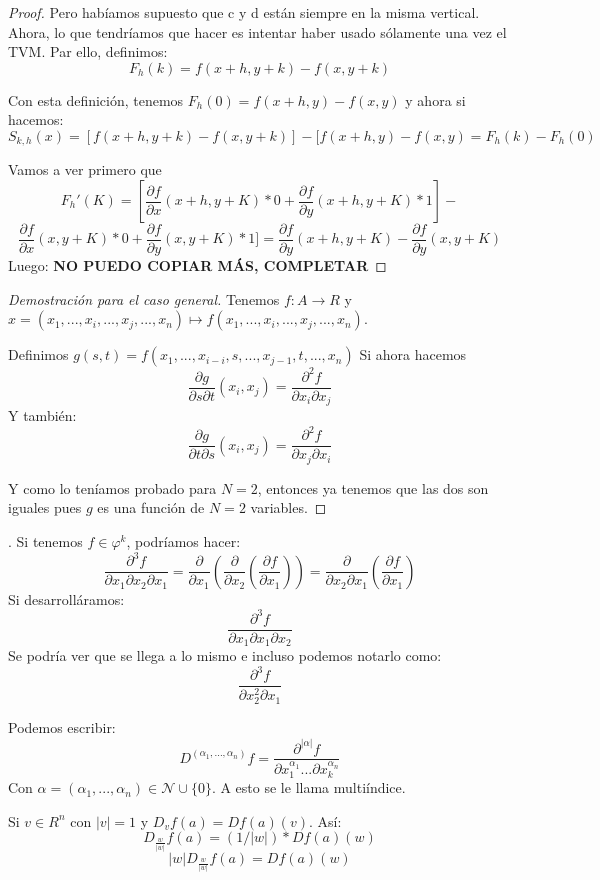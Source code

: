 \begin{proof}
Pero habíamos supuesto que c y d están siempre en la misma vertical. Ahora, lo que tendríamos que hacer es intentar haber usado sólamente una vez el TVM.
Par ello, definimos:
\[
F_h(k) = f(x+h,y+k)-f(x,y+k)
\]

Con esta definición, tenemos $F_h(0) = f(x+h,y)-f(x,y)$ y ahora si hacemos:
\[
S_{k,h}(x) =[f(x+h,y+k) - f(x,y+k)] - [f(x+h,y) -f(x,y) = F_h(k) - F_h(0)
\]

Vamos a ver primero que
\[
F_h'(K) = [\frac{\partial f}{\partial x}(x+h,y+K)*0 + \frac{\partial f}{\partial y}(x+h,y+K)*1] -
\]
\[
\frac{\partial f}{\partial x}(x,y+K)*0 + \frac{\partial f}{ \partial y}(x,y+K)*1] = \frac{\partial f}{\partial y}(x+h,y+K) - \frac{\partial f}{\partial y}(x,y+K)
\]
Luego:
\textbf{NO PUEDO COPIAR MÁS, COMPLETAR}

\end{proof}
\begin{proof}[Demostración para el caso general]
	Tenemos $f:A \to R$ y $x=(x_1,...,x_i,...,x_j,...,x_n) \mapsto f(x_1,...,x_i,...,x_j,...,x_n)$.

	Definimos $g(s,t) = f(x_1,...,x_{i-i},s,...,x_{j-1},t,...,x_n)$
	Si ahora hacemos
	\[
	\frac{\partial g}{\partial s \partial t}(x_i,x_j) = \frac{\partial^2 f}{\partial x_i \partial x_j}
	\]
	Y también:
		\[
	\frac{\partial g}{\partial t \partial s}(x_i,x_j) = \frac{\partial^2 f}{\partial x_j \partial x_i}
	\]

	Y como lo teníamos probado para $N=2$, entonces ya tenemos que las dos son iguales pues $g$ es una función de $N=2$ variables.


\end{proof}

\begin{nota}[Observación 1]. Si tenemos $f \in \varphi^k$, podríamos hacer:
\[
\frac{\partial^3 f}{\partial x_1 \partial x_2 \partial x_1} = \frac{\partial}{\partial x_1}(\frac{\partial}{\partial x_2}(\frac{\partial f}{\partial x_1})) = \frac{\partial}{\partial x_2 \partial x_1}(\frac{\partial f}{\partial x_1})
\]
Si desarrolláramos:
\[
\frac{\partial^3 f}{\partial x_1 \partial x_1 \partial x_2}
\]
Se podría ver que se llega a lo mismo e incluso podemos notarlo como:
\[
\frac{\partial^3 f}{\partial x_2^2 \partial x_1}
\]
\end{nota}
\begin{nota}
	Podemos escribir:
	\[
	D^{(\alpha_1,...,\alpha_n)}f = \frac{\partial^{|\alpha|}f}{\partial x_1^{\alpha_1}... \partial x_k^{\alpha_n}}
	\]
	Con $\alpha = (\alpha_1,...,\alpha_n) \in \mathcal{N}\cup \{0\}$. A esto se le llama multiíndice.

\end{nota}
\begin{nota}
	Si $v\in R^n$ con $|v| = 1 $ y $D_vf(a) = Df(a)(v)$. Así:
	\[
	D_{\frac{w}{|w|}}f(a) = (1/|w|)*Df(a)(w)
	\]\[
	|w|D_{\frac{w}{|w|}}f(a) = Df(a)(w)
	\]
\end{nota}


